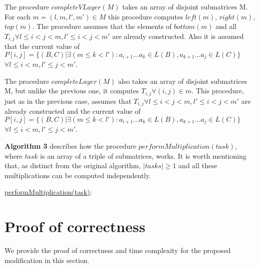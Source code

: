 \documentclass[runningheads]{llncs}
\begin{document}
The procedure $completeVLayer(M)$ takes an array of disjoint submatrices M. For each $m = (l, m, l', m') \in M$ this procedure computes $left(m)$, $right(m)$, $top(m)$. The procedure assumes that the elements of $bottom(m)$ and all $T_{i, j} \forall l \leq i < j < m,  l' \leq i < j < m'$ are already constructed. Also it is assumed that the current value of  $P[i, j] =  \{ (B, C) |\exists (m \le k < l'): a_{i + 1}...a_{k} \in L(B), a_{k + 1}...a_{j} \in L(C)\}$ $\forall l \leq i < m,  l' \leq j < m'$.
 
The procedure $completeLayer(M)$ also takes an array of disjoint submatrices M, but unlike the previous one, it computes $T_{i, j} \forall (i, j) \in m$. This procedure, just as in the previous case, assumes that  $T_{i, j} \forall l \leq i < j < m,  l' \leq i < j < m'$ are already constructed and the current value of  $P[i, j] =  \{ (B, C) |\exists (m \le k < l'): a_{i + 1}...a_{k} \in L(B), a_{k + 1}...a_{j} \in L(C)\}$ $\forall l \leq i < m,  l' \leq j < m'$.
 
\textbf{Algorithm 3} describes how the procedure $performMultiplication(task)$, where $task$ is an array of a triple of submatrices, works. It is worth mentioning that, as distinct from the original algorithm, $|tasks| \ge 1$ and all these multiplications can be computed independently.


\begin{algorithm}[h!]
\SetAlgoNoLine
\underline{performMultiplication(task)}{:}{\\
}
\caption{}
\end{algorithm}

\section{Proof of correctness}

We provide the proof of correctness and time complexity for the proposed modification in this section. 
\end{document}
